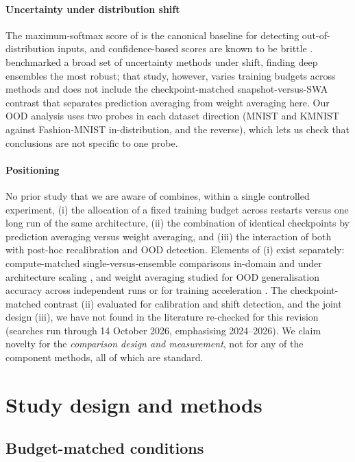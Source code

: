 \documentclass[11pt,a4paper]{article}
\newcommand{\swa}{\textsc{SWA}}
\begin{document}
\paragraph{Uncertainty under distribution shift}
The maximum-softmax score of \citet{hendrycks2017} is the canonical
baseline for detecting out-of-distribution inputs, and confidence-based
scores are known to be brittle \citep{nguyen2015}. \citet{ovadia2019}
benchmarked a broad set of uncertainty methods under shift, finding deep
ensembles the most robust; that study, however, varies training budgets
across methods and does not include the checkpoint-matched
snapshot-versus-\swa{} contrast that separates prediction averaging from
weight averaging here. Our OOD analysis uses two probes in each dataset
direction (MNIST and KMNIST against Fashion-MNIST in-distribution, and the
reverse), which lets us check that conclusions are not specific to one
probe.

\paragraph{Positioning}
No prior study that we are aware of combines, within a single controlled
experiment, (i) the allocation of a fixed training budget across restarts
versus one long run of the same architecture, (ii) the combination of
identical checkpoints by prediction averaging versus weight averaging, and
(iii) the interaction of both with post-hoc recalibration and OOD
detection. Elements of (i) exist separately: compute-matched
single-versus-ensemble comparisons in-domain \citep{ashukha2020} and under
architecture scaling \citep{brigato2021}, and weight averaging studied for
OOD generalisation accuracy across independent runs \citep{rame2022} or
for training acceleration \citep{ajroldi2025}. The checkpoint-matched
contrast (ii) evaluated for calibration and shift detection, and the joint
design (iii), we have not found in the literature re-checked for this
revision (searches run through 14 October 2026, emphasising 2024--2026).
We claim novelty for the \emph{comparison design and measurement}, not for
any of the component methods, all of which are standard.
\section{Study design and methods}\label{sec:methods}

\subsection{Budget-matched conditions}\label{sec:conditions}
\end{document}
